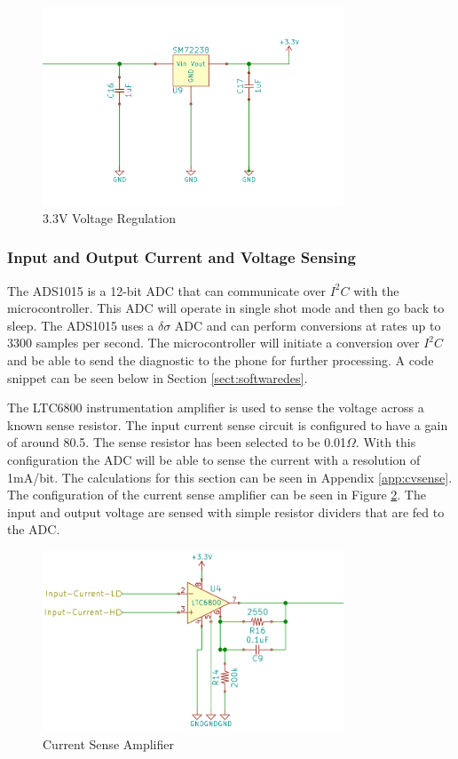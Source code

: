 \documentclass{article}
\numberwithin{figure}{section}
\numberwithin{equation}{section}
\begin{document}
{\begin{figure}[H]
	\centering
	\includegraphics[width=0.8\textwidth]{PS33V}
	\caption{3.3V Voltage Regulation}
	\label{fig:sm722}
\end{figure}

\subsubsection{Input and Output Current and Voltage Sensing}

The ADS1015 is a 12-bit ADC that can communicate over $I^2 C$ with the microcontroller. This ADC will operate in single shot mode and then go back to sleep. The ADS1015 uses a $\delta\sigma$ ADC and can perform conversions at rates up to 3300 samples per second. The microcontroller will initiate a conversion over $I^2 C$ and be able to send the diagnostic to the phone for further processing. A code snippet can be seen below in Section \ref{sect:softwaredes}.

The LTC6800 instrumentation amplifier is used to sense the voltage across a known sense resistor. The input current sense circuit is configured to have a gain of around 80.5. The sense resistor has been selected to be 0.01$\Omega$. With this configuration the ADC will be able to sense the current with a resolution of 1mA/bit. The calculations for this section can be seen in Appendix \ref{app:cvsense}. The configuration of the current sense amplifier can be seen in Figure \ref{fig:AV}. The input and output voltage are sensed with simple resistor dividers that are fed to the ADC.
\begin{figure}[H]
	\centering
	\includegraphics[width=0.8\textwidth]{AtoV}
	\caption{Current Sense Amplifier}
	\label{fig:AV}
\end{figure}

}
\end{document}
